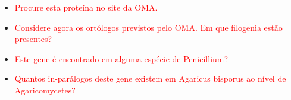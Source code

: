 \documentclass[letter,11pt]{book}
\begin{document}
\begin{itemize}
\item \textcolor{red}{Procure esta proteína no site da OMA.}
\item \textcolor{red}{Considere agora os ortólogos previstos pelo OMA. Em que filogenia estão presentes?}
\item \textcolor{red}{Este gene é encontrado em alguma espécie de Penicillium?}
\item \textcolor{red}{Quantos in-parálogos deste gene existem em Agaricus bisporus ao nível de Agaricomycetes?}
\end{itemize}






\begin{appendices}

\label{unixguide}


\label{embossguide}


\label{blastguide}

\end{appendices} 
\end{document}
